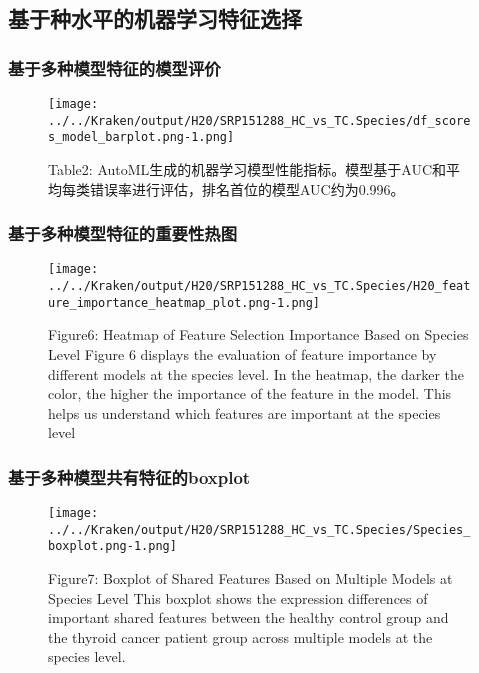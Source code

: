 \documentclass[
]{article}
\begin{document}
\subsection{基于种水平的机器学习特征选择}\label{ux57faux4e8eux79cdux6c34ux5e73ux7684ux673aux5668ux5b66ux4e60ux7279ux5f81ux9009ux62e9}

\subsubsection{基于多种模型特征的模型评价}\label{ux57faux4e8eux591aux79cdux6a21ux578bux7279ux5f81ux7684ux6a21ux578bux8bc4ux4ef7-1}

\begin{figure}
\centering
\texttt{[image: ../../Kraken/output/H20/SRP151288\_HC\_vs\_TC.Species/df\_scores\_model\_barplot.png-1.png]}
\caption{Table2:
AutoML生成的机器学习模型性能指标。模型基于AUC和平均每类错误率进行评估，排名首位的模型AUC约为0.996。}
\end{figure}

\subsubsection{基于多种模型特征的重要性热图}\label{ux57faux4e8eux591aux79cdux6a21ux578bux7279ux5f81ux7684ux91cdux8981ux6027ux70edux56fe-1}

\begin{figure}
\centering
\texttt{[image: ../../Kraken/output/H20/SRP151288\_HC\_vs\_TC.Species/H20\_feature\_importance\_heatmap\_plot.png-1.png]}
\caption{Figure6: Heatmap of Feature Selection Importance Based on
Species Level Figure 6 displays the evaluation of feature importance by
different models at the species level. In the heatmap, the darker the
color, the higher the importance of the feature in the model. This helps
us understand which features are important at the species level}
\end{figure}

\subsubsection{基于多种模型共有特征的boxplot}\label{ux57faux4e8eux591aux79cdux6a21ux578bux5171ux6709ux7279ux5f81ux7684boxplot-1}

\begin{figure}
\centering
\texttt{[image: ../../Kraken/output/H20/SRP151288\_HC\_vs\_TC.Species/Species\_boxplot.png-1.png]}
\caption{Figure7: Boxplot of Shared Features Based on Multiple Models at
Species Level This boxplot shows the expression differences of important
shared features between the healthy control group and the thyroid cancer
patient group across multiple models at the species level.}
\end{figure}
\end{document}

